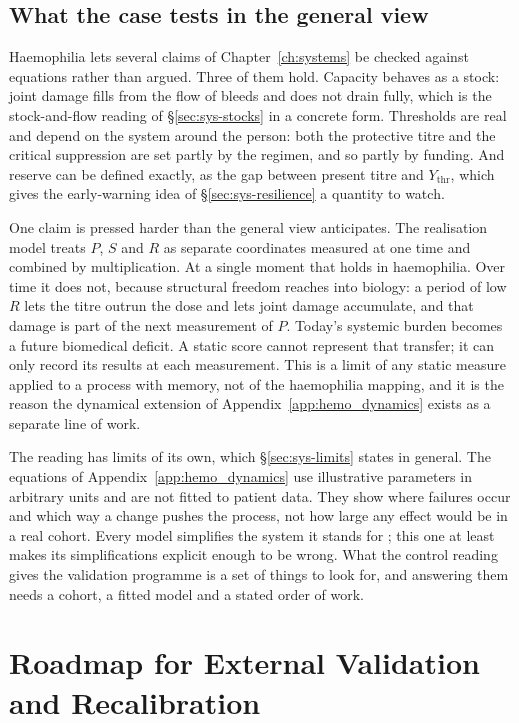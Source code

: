 \subsection{What the case tests in the general view}

Haemophilia lets several claims of Chapter~\ref{ch:systems} be checked against equations rather than argued. Three of them hold. Capacity behaves as a stock: joint damage fills from the flow of bleeds and does not drain fully, which is the stock-and-flow reading of \S\ref{sec:sys-stocks} in a concrete form. Thresholds are real and depend on the system around the person: both the protective titre and the critical suppression are set partly by the regimen, and so partly by funding. And reserve can be defined exactly, as the gap between present titre and $Y_{\text{thr}}$, which gives the early-warning idea of \S\ref{sec:sys-resilience} a quantity to watch.

One claim is pressed harder than the general view anticipates. The realisation model treats $P$, $S$ and $R$ as separate coordinates measured at one time and combined by multiplication. At a single moment that holds in haemophilia. Over time it does not, because structural freedom reaches into biology: a period of low $R$ lets the titre outrun the dose and lets joint damage accumulate, and that damage is part of the next measurement of $P$. Today's systemic burden becomes a future biomedical deficit. A static score cannot represent that transfer; it can only record its results at each measurement. This is a limit of any static measure applied to a process with memory, not of the haemophilia mapping, and it is the reason the dynamical extension of Appendix~\ref{app:hemo_dynamics} exists as a separate line of work.

The reading has limits of its own, which \S\ref{sec:sys-limits} states in general. The equations of Appendix~\ref{app:hemo_dynamics} use illustrative parameters in arbitrary units and are not fitted to patient data. They show where failures occur and which way a change pushes the process, not how large any effect would be in a real cohort. Every model simplifies the system it stands for \citep{box_1976}; this one at least makes its simplifications explicit enough to be wrong. What the control reading gives the validation programme is a set of things to look for, and answering them needs a cohort, a fitted model and a stated order of work.

\section{Roadmap for External Validation and Recalibration}
\label{sec:hemo_roadmap}

